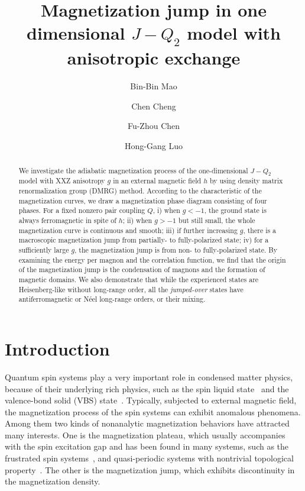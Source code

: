 \documentclass[article,10pt,onecolumn,superscriptaddress,floatfix]{revtex4}
\begin{document}
\title{Magnetization jump in one dimensional $J-Q_{2}$ model with anisotropic exchange}
\author{Bin-Bin Mao}
\author{Chen Cheng}
\author{Fu-Zhou Chen}
\author{Hong-Gang Luo}
\begin{abstract}
We investigate the adiabatic magnetization process of the one-dimensional $J-Q_{2}$ model with XXZ anisotropy $g$ in an external magnetic field $h$ by using density matrix renormalization group (DMRG) method. According to the characteristic of the magnetization curves, we draw a magnetization phase diagram consisting of four phases. For a fixed nonzero pair coupling $Q$, i) when $g<-1$, the ground state is always ferromagnetic in spite of $h$; ii) when $g>-1$ but still small, the whole magnetization curve is continuous and smooth; iii) if further increasing $g$, there is a macroscopic magnetization jump from partially- to fully-polarized state; iv) for a sufficiently large $g$, the magnetization jump is from non- to fully-polarized state.
By examining the energy per magnon and the correlation function, we find that the origin of the magnetization jump is the condensation of magnons and the formation of magnetic domains. We also demonstrate that while the experienced states are Heisenberg-like without long-range order, all the \textit{jumped-over} states have antiferromagnetic or N\'eel long-range orders, or their mixing.
\end{abstract}
\maketitle
\section{Introduction}
Quantum spin systems play a very important role in condensed matter physics, because of their underlying rich physics, such as the spin liquid state~\cite{Anderson1987} and the valence-bond solid (VBS) state~\cite{Read1989}. Typically, subjected to external magnetic field, the magnetization process of the spin systems can exhibit anomalous phenomena. Among them two kinds of nonanalytic magnetization behaviors have attracted many interests. One is the magnetization plateau, which usually accompanies with the spin excitation gap and has been found in many systems, such as the frustrated spin systems~\cite{Ono2003,Honecker2004}, and quasi-periodic systems with nontrivial topological property~\cite{Hida1993, Hu2014}. The other is the magnetization jump, which exhibits discontinuity in the magnetization density.
\end{document}
